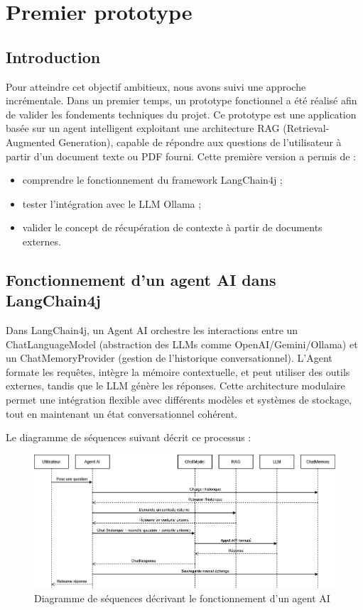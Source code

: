 \documentclass[12pt,a4paper]{report}
\begin{document}
	\section{Premier prototype}
	
	\subsection{Introduction}
	
	Pour atteindre cet objectif ambitieux, nous avons suivi une approche incrémentale. Dans un premier temps, un prototype fonctionnel a été réalisé afin de valider les fondements techniques du projet. Ce prototype est une application basée sur un agent intelligent exploitant une architecture RAG (Retrieval-Augmented Generation), capable de répondre aux questions de l’utilisateur à partir d’un document texte ou PDF fourni. Cette première version a permis de :
	\begin{itemize}
		\item comprendre le fonctionnement du framework LangChain4j ;
		\item tester l’intégration avec le LLM Ollama ;
		\item valider le concept de récupération de contexte à partir de documents externes.
	\end{itemize}
	
	\subsection{Fonctionnement d'un agent AI dans LangChain4j}
	
	Dans LangChain4j, un Agent AI orchestre les interactions entre un ChatLanguageModel (abstraction des LLMs comme OpenAI/Gemini/Ollama) et un ChatMemoryProvider (gestion de l'historique conversationnel). L'Agent formate les requêtes, intègre la mémoire contextuelle, et peut utiliser des outils externes, tandis que le LLM génère les réponses. Cette architecture modulaire permet une intégration flexible avec différents modèles et systèmes de stockage, tout en maintenant un état conversationnel cohérent.
	
	Le diagramme de séquences suivant décrit ce processus :
	
	\begin{figure}[H]
		\centering
		\includegraphics[width=\textwidth]{ds-ai-agent.drawio.png}
		\caption{Diagramme de séquences décrivant le fonctionnement d'un agent AI}
		\label{fig:ds-ai-agent.drawio}
	\end{figure}
	
\end{document}
